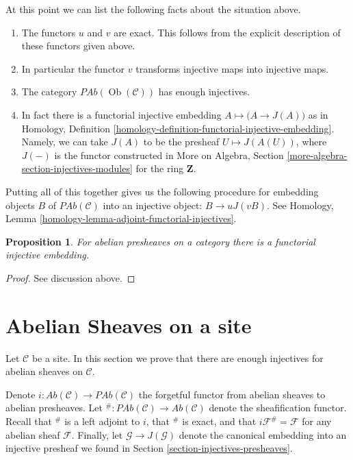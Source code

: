 \documentclass{stacks-project}
\theoremstyle{plain}
\newtheorem{proposition}[subsection]{Proposition}
\theoremstyle{definition}
\theoremstyle{remark}
\numberwithin{equation}{subsection}
\def\Ob{\mathop{\mathrm{Ob}}\nolimits}
\begin{document}
\medskip\noindent
At this point we can list the following facts
about the situation above.
\begin{enumerate}
\item The functors $u$ and $v$ are exact. This follows from
the explicit description of these functors given above.
\item In particular the functor $v$ transforms injective maps
into injective maps.
\item The category $\textit{PAb}(\Ob(\mathcal{C}))$
has enough injectives.
\item In fact there is a functorial injective embedding
$A \mapsto \big(A \to J(A)\big)$ as in
Homology, Definition \ref{homology-definition-functorial-injective-embedding}.
Namely, we can take $J(A)$ to be the
presheaf $U\mapsto J(A(U))$, where
$J(-)$ is the functor constructed in
More on Algebra, Section \ref{more-algebra-section-injectives-modules}
for the ring $\mathbf{Z}$.
\end{enumerate}
Putting all of this together gives us the following procedure
for embedding objects $B$ of $\textit{PAb}(\mathcal{C})$ into
an injective object: $B \to uJ(vB)$. See
Homology, Lemma \ref{homology-lemma-adjoint-functorial-injectives}.

\begin{proposition}
\label{proposition-presheaves-injectives}
For abelian presheaves on a category there is a functorial injective
embedding.
\end{proposition}

\begin{proof}
See discussion above.
\end{proof}












\section{Abelian Sheaves on a site}
\label{section-injectives-sheaves}

\noindent
Let $\mathcal{C}$ be a site. In this section we prove that there are
enough injectives for abelian sheaves on $\mathcal{C}$.

\medskip\noindent
Denote
$i : \textit{Ab}(\mathcal{C}) \longrightarrow \textit{PAb}(\mathcal{C})$
the forgetful functor from abelian sheaves to abelian presheaves.
Let
${}^\# : \textit{PAb}(\mathcal{C}) \longrightarrow \textit{Ab}(\mathcal{C})$
denote the sheafification functor. Recall that ${}^\#$ is a left adjoint
to $i$, that ${}^\#$ is exact, and that $i\mathcal{F}^\# = \mathcal{F}$
for any abelian sheaf $\mathcal{F}$. Finally, let
$\mathcal{G} \to J(\mathcal{G})$ denote the canonical
embedding into an injective presheaf we found in
Section \ref{section-injectives-presheaves}.
\end{document}
